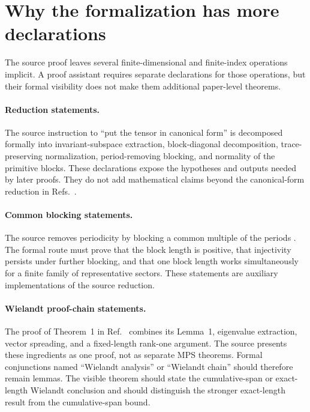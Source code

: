 \documentclass{article}
\begin{document}
\section{Why the formalization has more declarations}

The source proof leaves several finite-dimensional and finite-index operations
implicit. A proof assistant requires separate declarations for those
operations, but their formal visibility does not make them additional
paper-level theorems.

\paragraph{Reduction statements.}
The source instruction to ``put the tensor in canonical form'' is decomposed
formally into invariant-subspace extraction, block-diagonal decomposition,
trace-preserving normalization, period-removing blocking, and normality of the
primitive blocks. These declarations expose the hypotheses and outputs needed
by later proofs. They do not add mathematical claims beyond the canonical-form
reduction in Refs.~\cite{Cirac2016MPDO_arXiv,Cirac2021Matrix}.

\paragraph{Common blocking statements.}
The source removes periodicity by blocking a common multiple of the periods
\cite{Cirac2016MPDO_arXiv}. The formal route must prove that the block length is
positive, that injectivity persists under further blocking, and that one block
length works simultaneously for a finite family of representative sectors.
These statements are auxiliary implementations of the source reduction.

\paragraph{Wielandt proof-chain statements.}
The proof of Theorem~1 in Ref.~\cite{Sanz2010Quantum} combines its Lemma~1,
eigenvalue extraction, vector spreading, and a fixed-length rank-one argument.
The source presents these ingredients as one proof, not as separate MPS
theorems. Formal conjunctions named ``Wielandt analysis'' or ``Wielandt
chain'' should therefore remain lemmas. The visible theorem should state the
cumulative-span or exact-length Wielandt conclusion and should distinguish the
stronger exact-length result from the cumulative-span bound.
\end{document}
